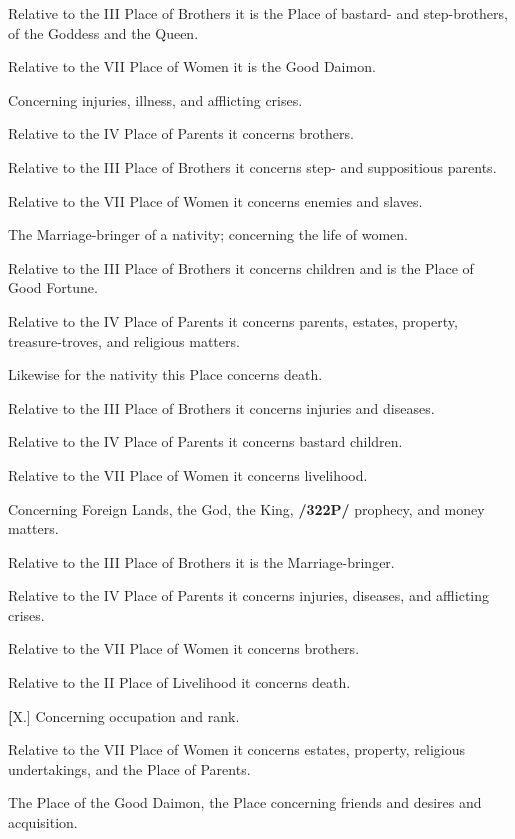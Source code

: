 \begin{description}[labelindent=0em , labelwidth=1em, labelsep=1em, leftmargin =!]
	Relative to the III Place of Brothers it is the Place of bastard- and step-brothers, of the Goddess and the Queen. 
	
	Relative to the VII Place of Women it is the Good Daimon.
	
\item[VI.] 
	Concerning injuries, illness, and afflicting crises. 
	
	Relative to the IV Place of Parents it concerns brothers. 
	
	Relative to the III Place of Brothers it concerns step- and suppositious parents. 
	
	Relative to the VII Place of Women it concerns enemies and slaves.

\item[VII.]
	 The Marriage-bringer of a nativity; concerning the life of women. 
	 
	 Relative to the III Place of Brothers it concerns children and is the Place of Good Fortune. 
	 
	 Relative to the IV Place of Parents it concerns parents, estates, property, treasure-troves, and religious matters.
	 
\item[VIII.]
	 Likewise for the nativity this Place concerns death. 
	 
	 Relative to the III Place of Brothers it concerns injuries and diseases. 
	 
	 Relative to the IV Place of Parents it concerns bastard children. 
	 
	 Relative to the VII Place of Women it concerns livelihood.
	 
\item[IX.]
	 Concerning Foreign Lands, the God, the King, \textbf{/322P/} prophecy, and money matters. 
	 
	 Relative to the III Place of Brothers it is the Marriage-bringer. 
	 
	 Relative to the IV Place of Parents it concerns injuries, diseases, and afflicting crises. 
	 
	 Relative to the VII Place of Women it concerns brothers. 
	 
	 Relative to the II Place of Livelihood it concerns death.
	 
\textbf[X.] 
	Concerning occupation and rank. 
	
	Relative to the VII Place of Women it concerns estates, property, religious undertakings, and the Place of Parents.
	
\item[XI.] 
	The Place of the Good Daimon, the Place concerning friends and desires and acquisition. 
	

\end{description}
